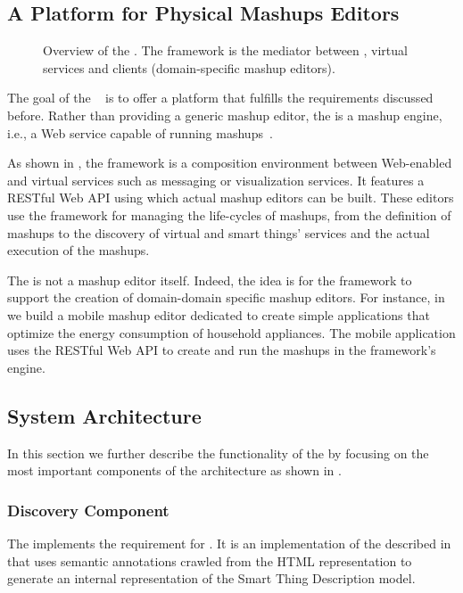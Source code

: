 
\subsection{A Platform for Physical Mashups Editors}\label{mashupFw}
\begin{figure}
\caption{Overview of the \pMashupsFw{}. The framework is the mediator between \sts{}, virtual services and clients (domain-specific mashup editors).}
\label{fig:mashupFwork}
\end{figure}
The goal of the \pMashupsFw{}~\cite{Aguilar2010,Guinard2010-mashup-home,Kovatsch2010} is to offer a platform that fulfills the requirements discussed before. Rather than providing a generic mashup editor, the \pMashupsFw{} is a mashup engine, i.e., a Web service capable of running mashups~\cite{Yu2008a}.

As shown in , the framework is a composition environment between Web-enabled \sts{} and virtual services such as messaging or visualization services. It features a RESTful Web API using which actual mashup editors can be built. These editors use the framework for managing the life-cycles of mashups, from the definition of mashups to the discovery of virtual and smart things' services and the actual execution of the mashups.

The \pMashupsFw{} is not a mashup editor itself. Indeed, the idea is for the framework to support the creation of domain-domain specific mashup editors. For instance, in  we build a mobile mashup editor dedicated to create simple applications that optimize the energy consumption of household appliances. The mobile application uses the \pMashupsFw{} RESTful Web API to create and run the mashups in the framework's engine.

\subsection{System Architecture}
In this section we further describe the functionality of the \pMashupsFw{} by focusing on the most important components of the architecture as shown in .

\subsubsection{Discovery Component}
The  implements the requirement for . It is an implementation of the \transService{} described in  that uses semantic annotations crawled from the \sts{} HTML representation to generate an internal representation of the Smart Thing Description model.

